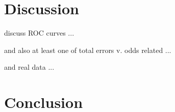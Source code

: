 \documentclass[letterpaper,11pt,oneside]{article}
\begin{document}
\section{Discussion} \label{sec:disc}

discuss ROC curves ...

and also at least one of total errors v. odds related ...

and real data ...

\section{Conclusion} \label{sec:conc}




%



\end{document}

